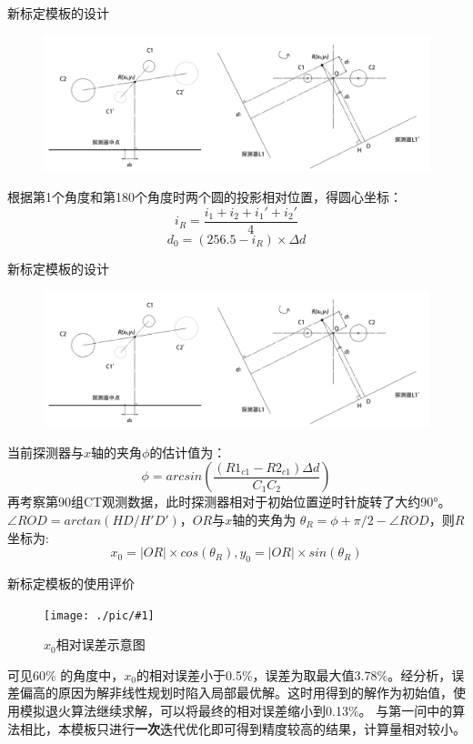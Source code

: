\documentclass{beamer} %
\newcommand{\midpic}[2]{  \begin{figure}[H]
\centering
\texttt{[image: ./pic/\#1]}\\
\caption{#2}
\end{figure}}
\begin{document}
\begin{frame}{新标定模板的设计}
	\begin{figure}[H]
		\centering
		\includegraphics[width=\textwidth]{./pic/merge1.png}\\
	\end{figure}
	\small 根据第1个角度和第180个角度时两个圆的投影相对位置，得圆心坐标：
	\[ i_R = \frac{i_1 + i_2 + i_1' + i_2'}{4} \]
	\[d_0 = (256.5 - i_R) \times \Delta d\]
	
\end{frame}

\begin{frame}{新标定模板的设计}
	\begin{figure}[H]
		\centering
		\includegraphics[width=\textwidth]{./pic/merge1.png}\\
	\end{figure}
	\small 当前探测器与\(x\)轴的夹角\(\phi\)的估计值为：
	\[ \phi = arcsin\left(  \frac{(R1_{c1} - R2_{c1})\Delta d}{C_1 C_2}   \right)\]
	\small 再考察第90组CT观测数据，此时探测器相对于初始位置逆时针旋转了大约90°。\(\angle ROD = arctan(HD/H'D') \)，\(OR\)与\(x\)轴的夹角为 \( \theta _R = \phi + \pi/2 - \angle ROD \)，则\(R\)坐标为:
	\[x_0 = |OR| \times cos(\theta_R), y_0 = |OR| \times sin(\theta_R) \]
\end{frame}

\begin{frame}{新标定模板的使用评价}
	\midpic{Error.png}{\(x_0\)相对误差示意图}
	\small 可见60\% 的角度中，\(x_0\)的相对误差小于0.5\%，误差为取最大值3.78\%。经分析，误差偏高的原因为解非线性规划时陷入局部最优解。这时用得到的解作为初始值，使用模拟退火算法继续求解，可以将最终的相对误差缩小到0.13\%。
	\small 与第一问中的算法相比，本模板只进行\textbf{一次}迭代优化即可得到精度较高的结果，计算量相对较小。
\end{frame}
\end{document}

